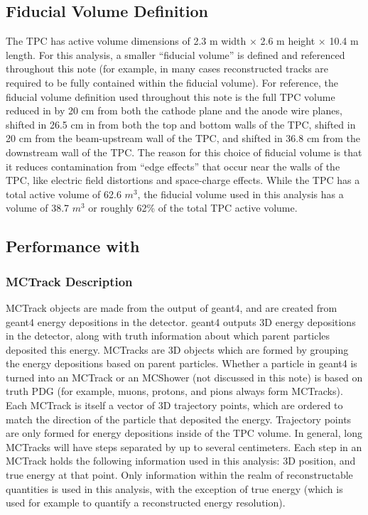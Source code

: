 \subsection{Fiducial Volume Definition}\label{fidvol_section}
The {\ub} TPC has active volume dimensions of 2.3 m width $\times$ 2.6 m height $\times$ 10.4 m length. For this analysis, a smaller ``fiducial volume'' is defined and referenced throughout this note (for example, in many cases reconstructed tracks are required to be fully contained within the fiducial volume). For reference, the fiducial volume definition used throughout this note is the full TPC volume reduced in by 20 cm from both the cathode plane and the anode wire planes, shifted in 26.5 cm in from both the top and bottom walls of the TPC, shifted in 20 cm from the beam-upstream wall of the TPC, and shifted in 36.8 cm from the downstream wall of the TPC. The reason for this choice of fiducial volume is that it reduces contamination from ``edge effects'' that occur near the walls of the TPC, like electric field distortions and space-charge effects. While the TPC has a total active volume of 62.6 $m^3$, the fiducial volume used in this analysis has a volume of 38.7 $m^3$ or roughly 62\% of the total TPC active volume.


\subsection{Performance with }


\subsubsection{MCTrack Description}\label{MCTrack_section}
{\sc MCTrack} objects are made from the output of {\sc geant}4, and are created from {\sc geant}4 energy depositions in the detector. {\sc geant}4 outputs 3D energy depositions in the detector, along with truth information about which parent particles deposited this energy. {\sc MCTracks} are 3D objects which are formed by grouping the energy depositions based on parent particles. Whether a particle in {\sc geant}4 is turned into an {\sc MCTrack} or an {\sc MCShower} (not discussed in this note) is based on truth PDG (for example, muons, protons, and pions always form {\sc MCTracks}).\\

Each {\sc MCTrack} is itself a vector of 3D trajectory points, which are ordered to match the direction of the particle that deposited the energy. Trajectory points are only formed for energy depositions inside of the TPC volume. In general, long {\sc MCTrack}s will have steps separated by up to several centimeters. Each step in an {\sc MCTrack} holds the following information used in this analysis: 3D position, and true energy at that point. Only information within the realm of reconstructable quantities is used in this analysis, with the exception of true energy (which is used for example to quantify a reconstructed energy resolution).\\

